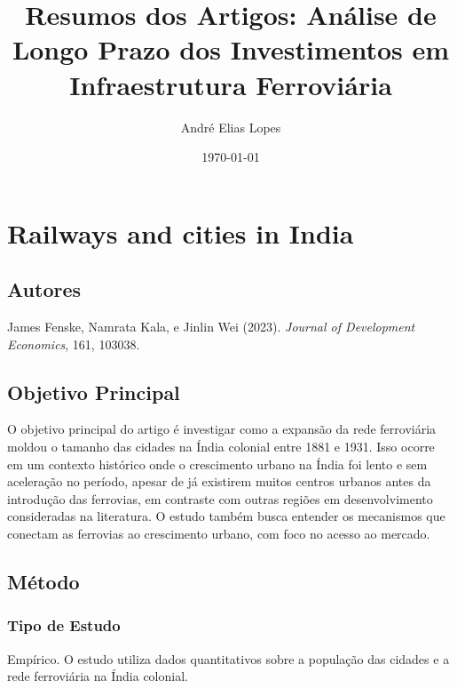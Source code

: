 \documentclass[12pt]{article}
\title{Resumos dos Artigos: Análise de Longo Prazo dos Investimentos em Infraestrutura Ferroviária}
\author{André Elias Lopes}
\date{\today} %
\begin{document}
\maketitle
\tableofcontents %
\newpage

\section{Railways and cities in India}

\subsection*{Autores}
James Fenske, Namrata Kala, e Jinlin Wei (2023). \textit{Journal of Development Economics}, 161, 103038.

\subsection*{Objetivo Principal}
O objetivo principal do artigo é investigar como a expansão da rede ferroviária moldou o tamanho das cidades na Índia colonial entre 1881 e 1931. Isso ocorre em um contexto histórico onde o crescimento urbano na Índia foi lento e sem aceleração no período, apesar de já existirem muitos centros urbanos antes da introdução das ferrovias, em contraste com outras regiões em desenvolvimento consideradas na literatura. O estudo também busca entender os mecanismos que conectam as ferrovias ao crescimento urbano, com foco no acesso ao mercado.

\subsection*{Método}

\subsubsection*{Tipo de Estudo}
Empírico. O estudo utiliza dados quantitativos sobre a população das cidades e a rede ferroviária na Índia colonial.
\end{document}
